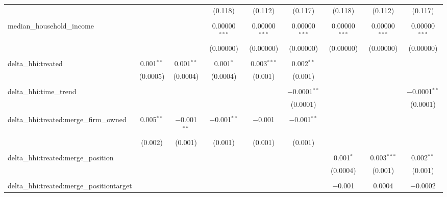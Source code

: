 \begin{table}[H]
{\begin{tabular}{@{\extracolsep{5pt}}lcccccccc}
   &  &  & (0.118) & (0.112) & (0.117) & (0.118) & (0.112) & (0.117) \\  

   & & & & & & & & \\  

  median\_household\_income &  &  & 0.00000$^{***}$ & 0.00000$^{***}$ & 0.00000$^{***}$ & 0.00000$^{***}$ & 0.00000$^{***}$ & 0.00000$^{***}$ \\  

   &  &  & (0.00000) & (0.00000) & (0.00000) & (0.00000) & (0.00000) & (0.00000) \\  

   & & & & & & & & \\  

  delta\_hhi:treated & 0.001$^{**}$ & 0.001$^{**}$ & 0.001$^{*}$ & 0.003$^{***}$ & 0.002$^{**}$ &  &  &  \\  

   & (0.0005) & (0.0004) & (0.0004) & (0.001) & (0.001) &  &  &  \\  

   & & & & & & & & \\  

  delta\_hhi:time\_trend &  &  &  &  & $-$0.0001$^{**}$ &  &  & $-$0.0001$^{**}$ \\  

   &  &  &  &  & (0.0001) &  &  & (0.0001) \\  

   & & & & & & & & \\  

  delta\_hhi:treated:merge\_firm\_owned & 0.005$^{**}$ & $-$0.001$^{**}$ & $-$0.001$^{**}$ & $-$0.001 & $-$0.001$^{**}$ &  &  &  \\  

   & (0.002) & (0.001) & (0.001) & (0.001) & (0.001) &  &  &  \\  

   & & & & & & & & \\  

  delta\_hhi:treated:merge\_position &  &  &  &  &  & 0.001$^{*}$ & 0.003$^{***}$ & 0.002$^{**}$ \\  

   &  &  &  &  &  & (0.0004) & (0.001) & (0.001) \\  

   & & & & & & & & \\  

  delta\_hhi:treated:merge\_positiontarget &  &  &  &  &  & $-$0.001 & 0.0004 & $-$0.0002 \\  


\end{tabular}}
\end{table}
